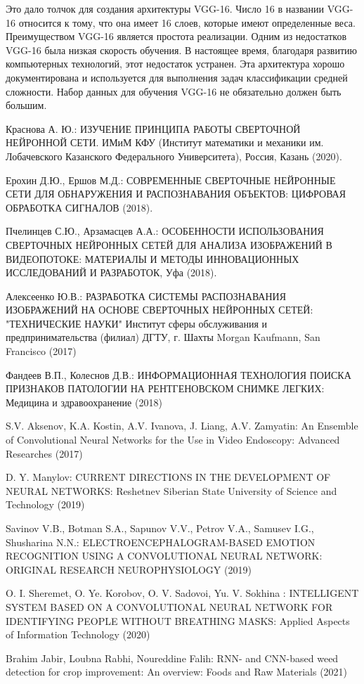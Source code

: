 \documentclass{svproc}
\begin{document}
Это дало толчок для создания архитектуры VGG-16. Число 16 в названии VGG-16 относится к тому, что она имеет 16 слоев, которые имеют определенные веса. Преимуществом VGG-16 является простота реализации. Одним из недостатков VGG-16 была низкая скорость обучения. В настоящее время, благодаря развитию компьютерных технологий, этот недостаток устранен. Эта архитектура хорошо документирована и используется для выполнения задач классификации средней сложности. Набор данных для обучения VGG-16 не обязательно должен быть большим.


%
%
\begin{thebibliography}{6}
%

Краснова А. Ю.: ИЗУЧЕНИЕ ПРИНЦИПА РАБОТЫ СВЕРТОЧНОЙ НЕЙРОННОЙ СЕТИ.
ИМиМ КФУ (Институт математики и механики им. Лобачевского
Казанского Федерального Университета), Россия, Казань (2020).

Ерохин Д.Ю., Ершов М.Д.: СОВРЕМЕННЫЕ СВЕРТОЧНЫЕ НЕЙРОННЫЕ СЕТИ ДЛЯ ОБНАРУЖЕНИЯ И РАСПОЗНАВАНИЯ ОБЪЕКТОВ: ЦИФРОВАЯ ОБРАБОТКА СИГНАЛОВ (2018).

Пчелинцев С.Ю., Арзамасцев А.А.: ОСОБЕННОСТИ ИСПОЛЬЗОВАНИЯ СВЕРТОЧНЫХ НЕЙРОННЫХ СЕТЕЙ ДЛЯ АНАЛИЗА ИЗОБРАЖЕНИЙ В ВИДЕОПОТОКЕ: 	МАТЕРИАЛЫ И МЕТОДЫ ИННОВАЦИОННЫХ ИССЛЕДОВАНИЙ И РАЗРАБОТОК, Уфа (2018).

Алексеенко Ю.В.: РАЗРАБОТКА СИСТЕМЫ РАСПОЗНАВАНИЯ ИЗОБРАЖЕНИЙ НА ОСНОВЕ СВЕРТОЧНЫХ НЕЙРОННЫХ СЕТЕЙ: "ТЕХНИЧЕСКИЕ НАУКИ" Институт сферы обслуживания и предпринимательства (филиал) ДГТУ, г. Шахты
Morgan Kaufmann, San Francisco (2017)

 Фандеев В.П., Колеснов Д.В.: ИНФОРМАЦИОННАЯ ТЕХНОЛОГИЯ ПОИСКА ПРИЗНАКОВ ПАТОЛОГИИ НА РЕНТГЕНОВСКОМ СНИМКЕ ЛЕГКИХ: Медицина и здравоохранение (2018)

 S.V. Aksenov, K.A. Kostin, A.V. Ivanova, J. Liang, A.V. Zamyatin: An Ensemble of Convolutional Neural Networks for the Use in Video Endoscopy: Advanced Researches (2017)
 
 D. Y. Manylov: CURRENT DIRECTIONS IN THE DEVELOPMENT OF NEURAL NETWORKS: Reshetnev Siberian State University of Science and Technology (2019)
 
 Savinov V.B., Botman S.A., Sapunov V.V., Petrov V.A., Samusev I.G., Shusharina N.N.: ELECTROENCEPHALOGRAM-BASED EMOTION RECOGNITION USING A CONVOLUTIONAL NEURAL NETWORK: ORIGINAL RESEARCH NEUROPHYSIOLOGY (2019)
 
 O. I. Sheremet, O. Ye. Korobov, O. V. Sadovoi, Yu. V. Sokhina
: INTELLIGENT SYSTEM BASED ON A CONVOLUTIONAL NEURAL NETWORK
FOR IDENTIFYING PEOPLE WITHOUT BREATHING MASKS: Applied Aspects of Information Technology (2020)

Brahim Jabir, Loubna Rabhi, Noureddine Falih: RNN- and CNN-based weed detection for crop improvement: An overview: Foods and Raw Materials (2021)


\end{thebibliography}
\end{document}
